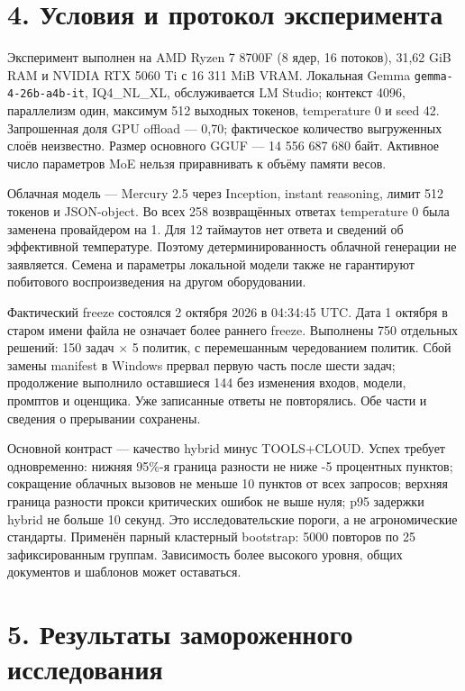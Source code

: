 \documentclass[14pt,a4paper]{extarticle}
\begin{document}
\section*{4. Условия и протокол эксперимента}

Эксперимент выполнен на AMD Ryzen 7 8700F (8 ядер, 16 потоков), 31,62 GiB RAM и NVIDIA RTX 5060 Ti с 16 311 MiB VRAM. Локальная Gemma \texttt{gemma-4-26b-a4b-it}, IQ4\_NL\_XL, обслуживается LM Studio; контекст 4096, параллелизм один, максимум 512 выходных токенов, temperature 0 и seed 42. Запрошенная доля GPU offload --- 0,70; фактическое количество выгруженных слоёв неизвестно. Размер основного GGUF --- 14 556 687 680 байт. Активное число параметров MoE нельзя приравнивать к объёму памяти весов.


Облачная модель --- Mercury 2.5 через Inception, instant reasoning, лимит 512 токенов и JSON-object. Во всех 258 возвращённых ответах temperature 0 была заменена провайдером на 1. Для 12 таймаутов нет ответа и сведений об эффективной температуре. Поэтому детерминированность облачной генерации не заявляется. Семена и параметры локальной модели также не гарантируют побитового воспроизведения на другом оборудовании.


Фактический freeze состоялся 2 октября 2026 в 04:34:45 UTC. Дата 1 октября в старом имени файла не означает более раннего freeze. Выполнены 750 отдельных решений: 150 задач \ensuremath{\times} 5 политик, с перемешанным чередованием политик. Сбой замены manifest в Windows прервал первую часть после шести задач; продолжение выполнило оставшиеся 144 без изменения входов, модели, промптов и оценщика. Уже записанные ответы не повторялись. Обе части и сведения о прерывании сохранены.


Основной контраст --- качество hybrid минус TOOLS+CLOUD. Успех требует одновременно: нижняя 95\%-я граница разности не ниже -5 процентных пунктов; сокращение облачных вызовов не меньше 10 пунктов от всех запросов; верхняя граница разности прокси критических ошибок не выше нуля; p95 задержки hybrid не больше 10 секунд. Это исследовательские пороги, а не агрономические стандарты. Применён парный кластерный bootstrap: 5000 повторов по 25 зафиксированным группам. Зависимость более высокого уровня, общих документов и шаблонов может оставаться.


\section*{5. Результаты замороженного исследования}
\end{document}
